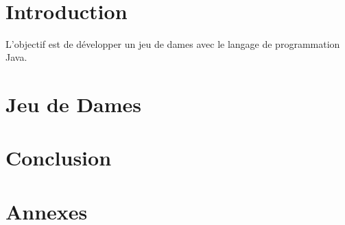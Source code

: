 \documentclass[oneside,openright,titlepage,numbers=noenddot,headinclude,footinclude=true,cleardoublepage=empty,listof=totoc,paper=a4,fontsize=12pt,french,DIV=calc]{scrreprt}
\begin{document}
\frenchspacing
\raggedbottom
{}
\clearpairofpagestyles
\rofoot[\pagemark]{\pagemark}

\pagestyle{plain}

\onehalfspacing


\newpage \ \newpage %

\pagestyle{scrheadings}
\onehalfspacing
{}

\listoffigures

\chapter{Introduction}\label{c:Introduction}


L'objectif est de développer un jeu de dames avec le langage de programmation Java.

\chapter{Jeu de Dames}\label{c:Developpement}


\chapter{Conclusion}\label{c:Conclusion}




\chapter*{Annexes}

\end{document}
